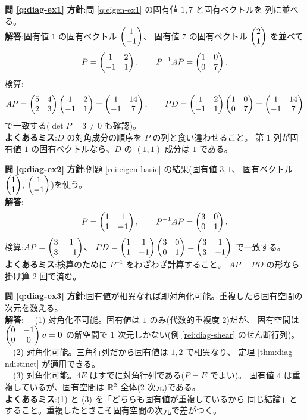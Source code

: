\bigskip
\noindent\textbf{問 \ref{q:diag-ex1}}\quad
\textbf{方針}:問 \ref{q:eigen-ex1} の固有値 $1, 7$ と固有ベクトルを
列に並べる。\\
\textbf{解答}:固有値 $1$ の固有ベクトル $\begin{pmatrix}1 \\ -1\end{pmatrix}$、
固有値 $7$ の固有ベクトル $\begin{pmatrix}2 \\ 1\end{pmatrix}$ を並べて
\[
P = \begin{pmatrix}1 & 2 \\ -1 & 1\end{pmatrix}, \qquad
P^{-1}AP = \begin{pmatrix}1 & 0 \\ 0 & 7\end{pmatrix}.
\]
検算:
\[
AP = \begin{pmatrix}5 & 4 \\ 2 & 3\end{pmatrix}\begin{pmatrix}1 & 2 \\ -1 & 1\end{pmatrix} = \begin{pmatrix}1 & 14 \\ -1 & 7\end{pmatrix},
\qquad
PD = \begin{pmatrix}1 & 2 \\ -1 & 1\end{pmatrix}\begin{pmatrix}1 & 0 \\ 0 & 7\end{pmatrix} = \begin{pmatrix}1 & 14 \\ -1 & 7\end{pmatrix}
\]
で一致する($\det P = 3 \neq 0$ も確認)。\\
\textbf{よくあるミス}:$D$ の対角成分の順序を $P$ の列と食い違わせること。
第 $1$ 列が固有値 $1$ の固有ベクトルなら、$D$ の $(1,1)$ 成分は $1$ である。

\bigskip
\noindent\textbf{問 \ref{q:diag-ex2}}\quad
\textbf{方針}:例題 \ref{rei:eigen-basic} の結果(固有値 $3, 1$、
固有ベクトル $\begin{pmatrix}1 \\ 1\end{pmatrix}$, $\begin{pmatrix}1 \\ -1\end{pmatrix}$)を使う。\\
\textbf{解答}:
\[
P = \begin{pmatrix}1 & 1 \\ 1 & -1\end{pmatrix}, \qquad
P^{-1}AP = \begin{pmatrix}3 & 0 \\ 0 & 1\end{pmatrix}.
\]
検算:$AP = \begin{pmatrix}3 & 1 \\ 3 & -1\end{pmatrix}$、
$PD = \begin{pmatrix}1 & 1 \\ 1 & -1\end{pmatrix}\begin{pmatrix}3 & 0 \\ 0 & 1\end{pmatrix} = \begin{pmatrix}3 & 1 \\ 3 & -1\end{pmatrix}$
で一致する。\\
\textbf{よくあるミス}:検算のために $P^{-1}$ をわざわざ計算すること。
$AP = PD$ の形なら掛け算 $2$ 回で済む。

\bigskip
\noindent\textbf{問 \ref{q:diag-ex3}}\quad
\textbf{方針}:固有値が相異なれば即対角化可能。重複したら固有空間の
次元を数える。\\
\textbf{解答}:
　(1) 対角化不可能。固有値は $1$ のみ(代数的重複度 $2$)だが、
固有空間は $\begin{pmatrix}0 & -1 \\ 0 & 0\end{pmatrix}\bm{v} = \bm{0}$ の解空間で
$1$ 次元しかない(例 \ref{rei:diag-shear} のせん断行列)。\\
　(2) 対角化可能。三角行列だから固有値は $1, 2$ で相異なり、
定理 \ref{thm:diag-ndistinct} が適用できる。\\
　(3) 対角化可能。$4E$ はすでに対角行列である($P = E$ でよい)。
固有値 $4$ は重複しているが、固有空間は $\mathbb{R}^2$ 全体($2$ 次元)である。\\
\textbf{よくあるミス}:(1) と (3) を「どちらも固有値が重複しているから
同じ結論」とすること。重複したときこそ固有空間の次元で差がつく。

